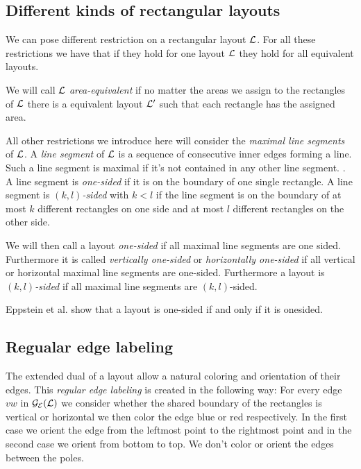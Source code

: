 \subsection{Different kinds of rectangular layouts}
  We can pose different restriction on a rectangular layout $\mathcal{L}$. For all these restrictions we have that if they hold for one layout $\mathcal{L}$ they hold for all equivalent layouts.

  We will call $\mathcal{L}$ \emph{area-equivalent} if no matter the areas we assign to the rectangles of $\mathcal{L}$ there is a equivalent layout $\mathcal{L}'$ such that each rectangle has the assigned area.

  All other restrictions we introduce here will consider the \emph{maximal line segments} of $\mathcal{L}$. A \emph{line segment} of $\mathcal{L}$ is a sequence of consecutive inner edges forming a line. Such a line segment is maximal if it's not contained in any other line segment. . A line segment is \emph{one-sided} if it is on the boundary of one single rectangle. A line segment is \emph{$(k,l)$-sided} with $k<l$ if the line segment is on the boundary of at most $k$ different rectangles on one side and at most $l$ different rectangles on the other side.

  We will then call a layout \emph{one-sided} if all maximal line segments are one sided. Furthermore it is called \emph{vertically one-sided} or \emph{horizontally one-sided} if all vertical or horizontal maximal line segments are one-sided. Furthermore a layout is \emph{$(k,l)$-sided} if all maximal line segments are $(k,l)$-sided.

  Eppstein et al. \cite{Eppstein2012} show that a layout is one-sided if and only if it is onesided.


\subsection{Regualar edge labeling}
  The extended dual of a layout allow a natural coloring and orientation of their edges. This \emph{regular edge labeling} is created in the following way:
  For every edge $vw$ in $\mathcal{G}_{\mathcal{E}}(\mathcal{L})$ we consider whether the shared boundary of the rectangles is vertical or horizontal we then color the edge blue or red respectively. In the first case we orient the edge from the  leftmost point to the rightmost point and in the second case we orient from bottom to top. We don't color or orient the edges between the poles.

